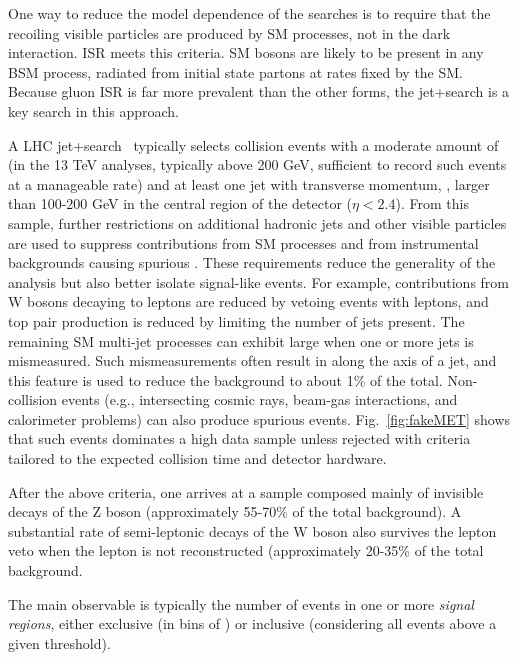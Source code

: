 One way to reduce the model dependence of the searches is to require that the recoiling visible particles are produced by SM processes, not in the dark interaction.
ISR meets this criteria.
SM bosons are likely to be present in any BSM process, radiated from initial state partons at rates fixed by the SM.
Because gluon ISR is far more prevalent than the other forms, the jet+\MET search is a key search in this approach.

A LHC jet+\MET search~\cite{Aaboud:2017phn,Sirunyan:2017jix} typically selects collision events with a moderate amount of \MET (in the 13 TeV analyses, typically above 200 GeV, sufficient to record such events at a manageable rate) and at least one jet with transverse momentum, \pt, larger than 100-200 GeV in the central region of the detector ($\eta<2.4$). 
From this sample, further restrictions on additional hadronic jets and other visible particles are used to suppress contributions from SM processes and from instrumental backgrounds causing spurious \MET.
These requirements reduce the generality of the analysis but also better isolate signal-like events.
For example, contributions from W bosons decaying to leptons are reduced by vetoing events with leptons, and top pair production is reduced by limiting the number of jets present.
The remaining SM multi-jet processes can exhibit large \MET when one or more jets is mismeasured.
Such mismeasurements often result in \MET along the axis of a jet, and this feature is used to reduce the background to about 1\% of the total.
Non-collision events (e.g., intersecting cosmic rays, beam-gas interactions, and calorimeter problems) can also produce spurious \MET events.
Fig.~\ref{fig:fakeMET} shows that such events dominates a high \MET data sample unless rejected with criteria tailored to the expected collision time and detector hardware.

After the above criteria, one arrives at a sample composed mainly of invisible decays of the Z boson (approximately 55-70\% of the total background).
A substantial rate of semi-leptonic decays of the W boson also survives the lepton veto when the lepton is not reconstructed (approximately 20-35\% of the total background.

The main observable is typically the number of events in one or more \MET \textit{signal regions}, either exclusive (in bins of \MET) or inclusive (considering all events above a given \MET threshold). 

\begin{marginnote}[]
\end{marginnote}

